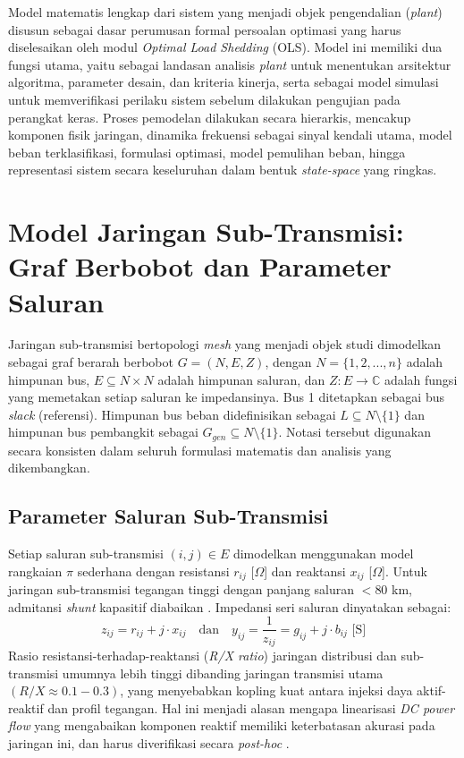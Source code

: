 Model matematis lengkap dari sistem yang menjadi objek pengendalian (\textit{plant}) disusun sebagai dasar perumusan formal persoalan optimasi yang harus diselesaikan oleh modul \textit{Optimal Load Shedding} (OLS). Model ini memiliki dua fungsi utama, yaitu sebagai landasan analisis \textit{plant} untuk menentukan arsitektur algoritma, parameter desain, dan kriteria kinerja, serta sebagai model simulasi untuk memverifikasi perilaku sistem sebelum dilakukan pengujian pada perangkat keras. Proses pemodelan dilakukan secara hierarkis, mencakup komponen fisik jaringan, dinamika frekuensi sebagai sinyal kendali utama, model beban terklasifikasi, formulasi optimasi, model pemulihan beban, hingga representasi sistem secara keseluruhan dalam bentuk \textit{state-space} yang ringkas.

\section{Model Jaringan Sub-Transmisi: Graf Berbobot dan Parameter Saluran}
\label{sec:Model_Jaringan_Distribusi}

Jaringan sub-transmisi bertopologi \textit{mesh} yang menjadi objek studi dimodelkan sebagai graf berarah berbobot $G=(N,E,Z)$, dengan $N=\{1,2,...,n\}$ adalah himpunan bus, $E\subseteq N\times N$ adalah himpunan saluran, dan $Z:E\rightarrow \mathbb{C}$ adalah fungsi yang memetakan setiap saluran ke impedansinya. Bus 1 ditetapkan sebagai bus \textit{slack} (referensi). Himpunan bus beban didefinisikan sebagai $L\subseteq N\setminus\{1\}$ dan himpunan bus pembangkit sebagai $G_{gen}\subseteq N\setminus\{1\}$. Notasi tersebut digunakan secara konsisten dalam seluruh formulasi matematis dan analisis yang dikembangkan.

\subsection{Parameter Saluran Sub-Transmisi}
\label{subsec:Parameter_Saluran_Distribusi}

Setiap saluran sub-transmisi $(i,j)\in E$ dimodelkan menggunakan model rangkaian $\pi$ sederhana dengan resistansi $r_{ij}$ [$\Omega$] dan reaktansi $x_{ij}$ [$\Omega$]. Untuk jaringan sub-transmisi tegangan tinggi dengan panjang saluran $< 80$ km, admitansi \textit{shunt} kapasitif diabaikan \cite{Glover2017}. Impedansi seri saluran dinyatakan sebagai:
\begin{equation}
    z_{ij} = r_{ij} + j\cdot x_{ij} \quad \text{dan} \quad y_{ij} = \frac{1}{z_{ij}} = g_{ij} + j\cdot b_{ij} \text{ [S]}
\end{equation}
Rasio resistansi-terhadap-reaktansi (\textit{R/X ratio}) jaringan distribusi dan sub-transmisi umumnya lebih tinggi dibanding jaringan transmisi utama $(R/X \approx 0.1 - 0.3)$, yang menyebabkan kopling kuat antara injeksi daya aktif-reaktif dan profil tegangan. Hal ini menjadi alasan mengapa linearisasi \textit{DC power flow} yang mengabaikan komponen reaktif memiliki keterbatasan akurasi pada jaringan ini, dan harus diverifikasi secara \textit{post-hoc} \cite{Farivar2013}.

